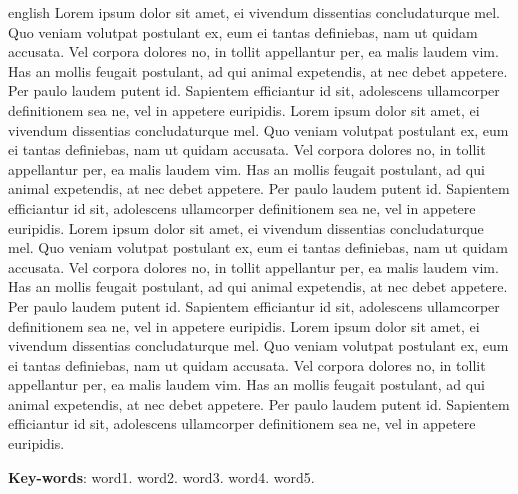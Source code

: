 \documentclass[
	12pt,				%
	openright,			%
	oneside,			%
	a4paper,			%
	english,			%
	french,				%
	spanish,			%
	brazil,				%
	]{abntex2}
\begin{document}
\begin{resumo}[Abstract]
 \begin{otherlanguage*}{english}
   \vspace{\onelineskip}
    \noindent 
Lorem ipsum dolor sit amet, ei vivendum dissentias concludaturque mel. Quo veniam volutpat postulant ex, eum ei tantas definiebas, nam ut quidam accusata. Vel corpora dolores no, in tollit appellantur per, ea malis laudem vim. Has an mollis feugait postulant, ad qui animal expetendis, at nec debet appetere. Per paulo laudem putent id. Sapientem efficiantur id sit, adolescens ullamcorper definitionem sea ne, vel in appetere euripidis. Lorem ipsum dolor sit amet, ei vivendum dissentias concludaturque mel. Quo veniam volutpat postulant ex, eum ei tantas definiebas, nam ut quidam accusata. Vel corpora dolores no, in tollit appellantur per, ea malis laudem vim. Has an mollis feugait postulant, ad qui animal expetendis, at nec debet appetere. Per paulo laudem putent id. Sapientem efficiantur id sit, adolescens ullamcorper definitionem sea ne, vel in appetere euripidis. Lorem ipsum dolor sit amet, ei vivendum dissentias concludaturque mel. Quo veniam volutpat postulant ex, eum ei tantas definiebas, nam ut quidam accusata. Vel corpora dolores no, in tollit appellantur per, ea malis laudem vim. Has an mollis feugait postulant, ad qui animal expetendis, at nec debet appetere. Per paulo laudem putent id. Sapientem efficiantur id sit, adolescens ullamcorper definitionem sea ne, vel in appetere euripidis. Lorem ipsum dolor sit amet, ei vivendum dissentias concludaturque mel. Quo veniam volutpat postulant ex, eum ei tantas definiebas, nam ut quidam accusata. Vel corpora dolores no, in tollit appellantur per, ea malis laudem vim. Has an mollis feugait postulant, ad qui animal expetendis, at nec debet appetere. Per paulo laudem putent id. Sapientem efficiantur id sit, adolescens ullamcorper definitionem sea ne, vel in appetere euripidis.
   
   \vspace{\onelineskip}
   
   \noindent  \textbf{Key-words}:  word1. word2. word3. word4. word5.
 \end{otherlanguage*}
\end{resumo}

\listoffigures*
\cleardoublepage

\listoftables*
\cleardoublepage
\end{document}
